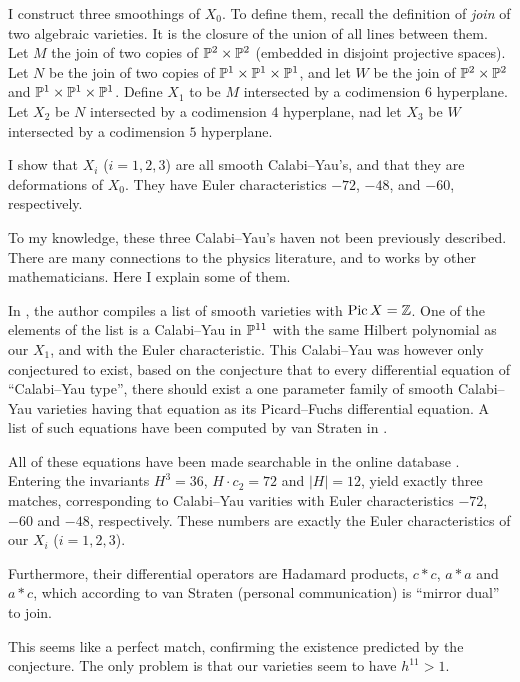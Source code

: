 I construct three smoothings of $X_0$. To define them, recall the definition of \emph{join} of two algebraic varieties. It is the closure of the union of all lines between them. Let $M$ the join of two copies of $\P^2 \times \P^2$ (embedded in disjoint projective spaces). Let $N$ be the join of two copies of $\P^1 \times \P^1 \times \P^1$, and let $W$ be the join of $\P^2 \times \P^2$ and $\P^1 \times \P^1 \times \P^1$. Define $X_1$ to be $M$ intersected by a codimension $6$ hyperplane. Let $X_2$ be $N$ intersected by a codimension $4$ hyperplane, nad let $X_3$ be $W$ intersected by a codimension $5$ hyperplane. 

I show that $X_i$ ($i=1,2,3$) are all smooth Calabi--Yau's, and that they are deformations of $X_0$. They have Euler characteristics $-72$, $-48$, and $-60$, respectively. 

To my knowledge, these three Calabi--Yau's haven not been previously described. There are many connections to the physics literature, and to works by other mathematicians. Here I explain some of them.

In \cite{kapustka_delpezzo}, the author compiles a list of smooth \CY varieties with $\Pic X = \Z$. One of the elements of the list is a Calabi--Yau in $\P^{11}$ with the same Hilbert polynomial as our $X_1$, and with the Euler characteristic. This Calabi--Yau was however only conjectured to exist, based on the conjecture that to every differential equation of ``Calabi--Yau type'', there should exist a one parameter family of smooth Calabi--Yau varieties having that equation as its Picard--Fuchs differential equation. A list of such equations have been computed by van Straten in \cite{monodromy_straten}.

All of these equations have been made searchable in the online database \cite{cy_database}. Entering the invariants $H^3=36$, $H \cdot c_2 = 72$ and $|H|=12$, yield exactly three matches, corresponding to Calabi--Yau varities with Euler characteristics $-72$, $-60$ and $-48$, respectively. These numbers are exactly the Euler characteristics of our $X_i$ ($i=1,2,3$).

Furthermore, their differential operators are Hadamard products, $c \ast c$, $a \ast a$ and $a \ast c$, which according to van Straten (personal communication) is ``mirror dual'' to join.

This seems like a perfect match, confirming the existence predicted by the conjecture. The only problem is that our varieties seem to have $h^{11} > 1$.

